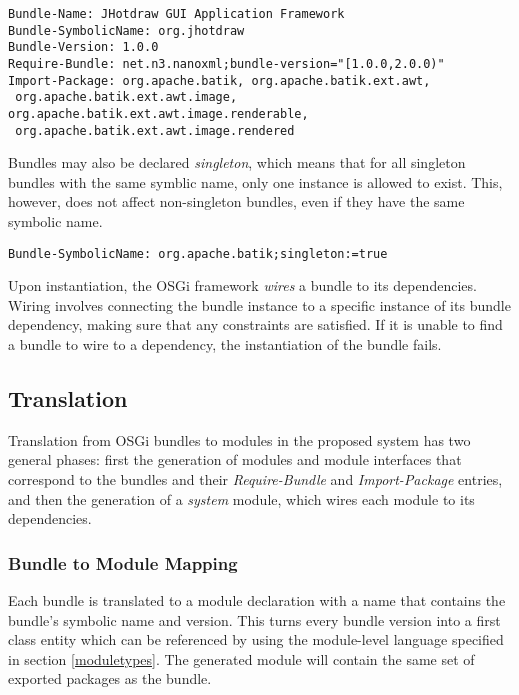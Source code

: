 \begin{lstlisting}[caption=Require-bundle and Import-package]
Bundle-Name: JHotdraw GUI Application Framework
Bundle-SymbolicName: org.jhotdraw
Bundle-Version: 1.0.0
Require-Bundle: net.n3.nanoxml;bundle-version="[1.0.0,2.0.0)"
Import-Package: org.apache.batik, org.apache.batik.ext.awt,
 org.apache.batik.ext.awt.image, org.apache.batik.ext.awt.image.renderable,
 org.apache.batik.ext.awt.image.rendered
\end{lstlisting}

Bundles may also be declared \textit{singleton}, which means that for all
singleton bundles with the same symblic name, only one instance is allowed to
exist. This, however, does not affect non-singleton bundles, even if they have
the same symbolic name.

\begin{lstlisting}[caption=Singleton Bundle]
Bundle-SymbolicName: org.apache.batik;singleton:=true
\end{lstlisting}

Upon instantiation, the OSGi framework \textit{wires} a bundle to its dependencies.
Wiring involves connecting the bundle instance to a specific instance of its bundle dependency, making
sure that any constraints are satisfied. If it is unable to find a bundle to wire to a
dependency, the instantiation of the bundle fails.

\subsection{Translation}

Translation from OSGi bundles to modules in the proposed system has two general phases:
first the generation of modules and module interfaces that correspond to the bundles and
their \textit{Require-Bundle} and \textit{Import-Package} entries, and then the generation of
a \textit{system} module, which wires each module to its dependencies.

\subsubsection{Bundle to Module Mapping}

Each bundle is translated to a module declaration with a name that contains the bundle's
symbolic name and version. This turns every bundle version into a first class entity which
can be referenced by using the module-level language specified in section \ref{moduletypes}.
The generated module will contain the same set of exported packages as the bundle.

